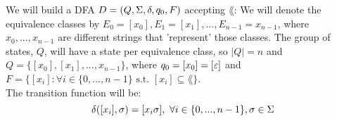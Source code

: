 We will build a DFA $D = (Q, \Sigma, \delta, q_0, F)$ accepting $\lang$:
We will denote the equivalence classes by $E_0=[x_0], E_1=[x_1], ... , E_{n-1}=x_{n-1}$,
where $x_0,...,x_{n-1}$ are different strings that 'represent' those classes.
The group of states, $Q$, will have a state per equivalence class, so $|Q|=n$
and $Q=\{[x_0],[x_1],...,x_{n-1}\}$, where $q_0=[x_0]=[\varepsilon]$
and $F=\{[x_i] : \forall i \in \{0,...,n-1\} \text{ s.t. } [x_i] \subseteq \lang \}$. \\
The transition function will be:
\[
    \delta([x_i], \sigma) = [x_i \sigma], \text{ } \forall i \in \{0,...,n-1\}, \sigma \in \Sigma
\]

